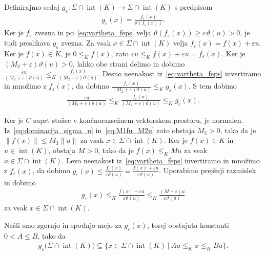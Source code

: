 \documentclass[mat2, tisk]{fmfdelo}
\begin{document}
\begin{dokaz}
  Definirajmo sedaj
  $g_\varepsilon\colon\Sigma\cap\operatorname{int}(K)
  \longrightarrow\Sigma\cap\operatorname{int}(K)$ s predpisom
  \begin{align*}
  g_\varepsilon(x)
  =
  \frac{f_\varepsilon(x)}
  {\vartheta(f_\varepsilon(x))}.
  \end{align*}
  Ker je $f_\varepsilon$ zvezna in po~\eqref{eq:vartheta_feps}
  velja $\vartheta(f_\varepsilon(x))
  \geq\varepsilon\vartheta(u)>0$, je tudi
  preslikava $g_\varepsilon$ zvezna.
  Za vsak $x\in\Sigma\cap\operatorname{int}(K)$ velja
  $f_\varepsilon(x)=f(x)+\varepsilon u$. Ker je $f(x)\in K$, je 
  $0\leq_K f(x)$, zato $\varepsilon u\leq_K f(x)+\varepsilon u=f_\varepsilon(x)$. Ker je 
  $(M_2+\varepsilon)\vartheta(u)>0$, lahko obe strani delimo in dobimo 
  $\frac{\varepsilon u}{(M_2+\varepsilon)\vartheta(u)}\leq_K\frac{f_\varepsilon(x)}{(M_2+\varepsilon)\vartheta(u)}$.
  Desno neenakost iz~\eqref{eq:vartheta_feps} invertiramo in množimo z $f_\varepsilon(x)$, da dobimo
  $\frac{f_\varepsilon(x)}{(M_2+\varepsilon)\vartheta(u)}\leq_K g_\varepsilon(x)$. S tem dobimo
  \begin{align*}
  \frac{\varepsilon u}
  {(M_2+\varepsilon)\vartheta(u)}
  \leq_K
  \frac{f_\varepsilon(x)}
  {(M_2+\varepsilon)\vartheta(u)}
  \leq_K
  g_\varepsilon(x).
  \end{align*}

  Ker je $C$ zaprt stožec v končnorazsežnem vektorskem prostoru, je
  normalen. Iz~\eqref{eq:dominacija_sigma_u} in~\eqref{eq:M1fu_M2u} zato obstaja $M_3>0$, tako da je
  $\|f(x)\|\leq M_3\|u\|$ za vsak
  $x\in\Sigma\cap\operatorname{int}(K)$. Ker je
  $f(x)\in K$ in $u\in\operatorname{int}(K)$, obstaja $M>0$, tako da je
  $f(x)\leq_K Mu$ za vsak
  $x\in\Sigma\cap\operatorname{int}(K)$. Levo neenakost iz~\eqref{eq:vartheta_feps} invertiramo in množimo 
  z $f_\varepsilon(x)$, da dobimo $g_\varepsilon(x) \leq \frac{f_\varepsilon(x)}{\varepsilon\vartheta(u)} = 
  \frac{f(x)+\varepsilon u}{\varepsilon\vartheta(u)}$. Uporabimo prejšnji razmislek in dobimo
  \begin{align*}
  g_\varepsilon(x)
  \leq_K
  \frac{f(x)+\varepsilon u}
  {\varepsilon\vartheta(u)}
  \leq_K
  \frac{(M+\varepsilon)u}
  {\varepsilon\vartheta(u)}
  \end{align*}
  za vsak $x\in\Sigma\cap\operatorname{int}(K)$.

  Našli smo zgornjo in spodnjo mejo za $g_\varepsilon (x)$, torej obstajata konstanti $0<A\leq B$, tako da
  \begin{align}
  g_\varepsilon
  \bigl(\Sigma\cap\operatorname{int}(K)\bigr)
  \subseteq
  \{x\in\Sigma\cap\operatorname{int}(K) ~|~ Au\leq_K x\leq_K Bu\}.
  \label{eq:geps_redovni_interval}
  \end{align}
  

\end{dokaz}
\end{document}
